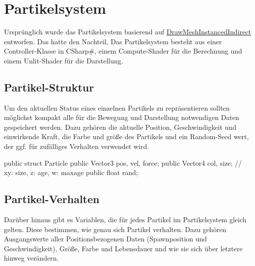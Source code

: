 \section{Partikelsystem}

Ursprünglich wurde das Partikelsystem basierend auf \href{https://docs.unity3d.com/ScriptReference/Graphics.DrawMeshInstancedIndirect.html}{DrawMeshInstancedIndirect} entworfen. Das hatte den Nachteil, 
Das Partikelsystem besteht aus einer Controller-Klasse in CSharp\#, einem Compute-Shader für die Berechnung und einem Unlit-Shader für die Darstellung.


\subsection{Partikel-Struktur}

Um den aktuellen Status eines einzelnen Partikels zu repräsentieren sollten möglichst kompakt alle für die Bewegung und Darstellung notwendigen Daten gespeichert werden. Dazu gehören die aktuelle Position, Geschwindigkeit und einwirkende Kraft, die Farbe und grö{\ss}e des Partikels und ein Random-Seed wert, der ggf. für zufälliges Verhalten verwendet wird.

\begin{csh}[caption=Partikelstruktur,label=lst:particle]
public struct Particle
{
    public Vector3 pos, vel, force;
    public Vector4 col, size; // xy: size,  z: age, w: maxage
    public float rand;
}
\end{csh}


\subsection{Partikel-Verhalten}

Darüber hinaus gibt es Variablen, die für jedes Partikel im Partikelsystem gleich gelten. Diese bestimmen, wie genau sich Partikel verhalten. Dazu gehören Ausgangswerte aller Positionsbezogenen Daten (Spawnposition und Geschwindigkeit), Grö{\ss}e, Farbe und Lebensdauer und wie sie sich über letztere hinweg verändern.





